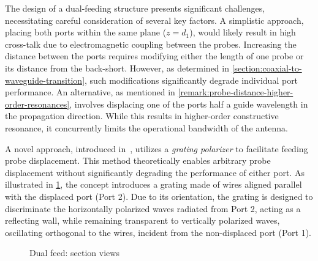 \documentclass[11pt,a4paper,twoside,openany]{report}
\newlength{\twosubht}
\begin{document}
The design of a dual-feeding structure presents significant challenges, necessitating careful consideration of several key factors. A simplistic approach, placing both ports within the same plane ($z = d_1$), would likely result in high cross-talk due to electromagnetic coupling between the probes. Increasing the distance between the ports requires modifying either the length of one probe or its distance from the back-short. However, as determined in \cref{section:coaxial-to-waveguide-transition}, such modifications significantly degrade individual port performance. An alternative, as mentioned in \cref{remark:probe-distance-higher-order-resonances}, involves displacing one of the ports half a guide wavelength in the propagation direction. While this results in higher-order constructive resonance, it concurrently limits the operational bandwidth of the antenna.

A novel approach, introduced in~\parencite{karki-et-al:dual-polarized-probe-for-planar-near-field-measurement}, utilizes a \emph{grating polarizer} to facilitate feeding probe displacement. This method theoretically enables arbitrary probe displacement without significantly degrading the performance of either port. As illustrated in \cref{fig:dual-feed-model}, the concept introduces a grating made of wires aligned parallel with the displaced port (Port 2). Due to its orientation, the grating is designed to discriminate the horizontally polarized waves radiated from Port 2, acting as a reflecting wall, while remaining transparent to vertically polarized waves, oscillating orthogonal to the wires, incident from the non-displaced port (Port 1).

\begin{figure}[bh]
    \sbox{}
    \setlength{\twosubht}{\ht\twosubbox}

    \centering
    \quad
    \caption{\label{fig:dual-feed-model}Dual feed: section views}
\end{figure}
\end{document}
